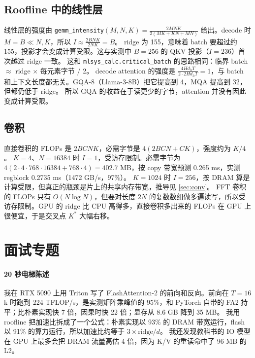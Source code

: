 \documentclass[11pt,a4paper]{ctexart}
\begin{document}
\subsection{Roofline 中的线性层}
线性层的强度由 \texttt{gemm\_intensity}$(M,N,K)=\frac{2MNK}{2(MK+KN+MN)}$ 给出。decode 时 $M=B\ll N,K$，所以 $I\approx\frac{2BNK}{2NK}=B$。
ridge 为 155，意味着 batch 要超过约 155，投影才会变成计算受限。这与实测中 $B=256$ 的 QKV 投影（$I=236$）首次越过 ridge 一致。
这和 \texttt{mlsys\_calc.critical\_batch} 的思路相同：临界 batch $\approx$ ridge $\times$ 每元素字节 / 2。
decode attention 的强度是 $\frac{4Hd_hT}{2\cdot2Hd_hT}=1$，与 batch 和上下文长度都无关。GQA-8\cite{gqa}（Llama-3-8B）把它提高到 4，MQA\cite{mqa} 提高到 32，但都仍低于 ridge。
所以 GQA 的收益在于读更少的字节，attention 并没有因此变成计算受限。

\subsection{卷积}
直接卷积的 FLOPs 是 $2BCNK$，必需字节是 $4(2BCN+CK)$，强度约为 $K/4$。
$K=4$、$N=16384$ 时 $I=1$，受访存限制。必需字节为 $4(2\cdot4\cdot768\cdot16384+768\cdot4)=402.7$ MB，按 copy 带宽预测 0.265 ms，实测 regblock 0.2735 ms（1472 GB/s，97\%）。
$K=1024$ 时 $I=256$，按 DRAM 算是计算受限，但真正的瓶颈是片上的共享内存带宽，推导见 \cref{sec:conv}。
FFT 卷积的 FLOPs 只有 $O(N\log N)$，但要对长度 $2N$ 的复数数组做多遍读写，所以受访存限制。GPU 的 ridge 比 CPU 高得多，直接卷积多出来的 FLOPs 在 GPU 上很便宜，于是交叉点 $K^{*}$ 大幅右移。

\section{面试专题}

\paragraph{20 秒电梯陈述}
我在 RTX 5090 上用 Triton 写了 FlashAttention-2 的前向和反向。前向在 $T=16$k 时跑到 224 TFLOP/s，是实测矩阵乘峰值的 95\%，和 PyTorch 自带的 FA2 持平；比朴素实现快 7 倍，因果时快 22 倍；显存从 8.6 GB 降到 35 MB。
我用 roofline 把加速比拆成了一个公式：朴素实现以 93\% 的 DRAM 带宽运行，flash 以 91\% 的算力运行，所以加速比约等于 $3\times\text{ridge}/d$。
我还发现教科书的 IO 模型在 GPU 上最多会把 DRAM 流量高估 4 倍，因为 K/V 的重读命中了 96 MB 的 L2。
\end{document}
